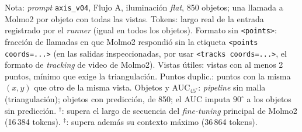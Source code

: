 \begin{table}[htbp]
\vspace{1.5ex}
\begin{minipage}{\wd\tablebox}
\footnotesize
Nota: \textit{prompt} \texttt{axis\_v04}, Flujo A, iluminación \textit{flat}, 850 objetos; una llamada a Molmo2 por objeto con todas las vistas. Tokens: largo real de la entrada registrado por el \textit{runner} (igual en todos los objetos). Formato sin \texttt{<points>}: fracción de llamadas en que Molmo2 respondió sin la etiqueta \texttt{<points coords=...>} (en las salidas inspeccionadas, por usar \texttt{<tracks coords=...>}, el formato de \textit{tracking} de video de Molmo2). Vistas útiles: vistas con al menos 2 puntos, mínimo que exige la triangulación. Puntos duplic.: puntos con la misma $(x, y)$ que otro de la misma vista. Objetos y AUC$_{45^\circ}$: \textit{pipeline} sin malla (triangulación); objetos con predicción, de 850; el AUC imputa $90^\circ$ a los objetos sin predicción. $^{\dagger}$: supera el largo de secuencia del \textit{fine-tuning} principal de Molmo2 (16\,384 tokens). $^{\ddagger}$: supera además su contexto máximo (36\,864 tokens). 
\end{minipage}
\end{table}

